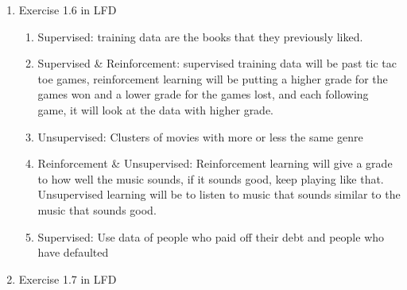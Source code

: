 \documentclass{article}
\begin{document}
\begin{enumerate}
        \item Exercise 1.6 in LFD
        \begin{enumerate}[label=(\alph*)]
            \item Supervised: training data are the books that they previously liked.
            \item Supervised \& Reinforcement: supervised training data will be past tic tac toe games, reinforcement learning will be putting a higher grade for the games won and a lower grade for the games lost, and each following game, it will look at the data with higher grade.
            \item Unsupervised: Clusters of movies with more or less the same genre
            \item Reinforcement \& Unsupervised: Reinforcement learning will give a grade to how well the music sounds, if it sounds good, keep playing like that. Unsupervised learning will be to listen to music that sounds similar to the music that sounds good.
            \item Supervised: Use data of people who paid off their debt and people who have defaulted
        \end{enumerate}

        \item Exercise 1.7 in LFD
    \end{enumerate}
\end{document}
